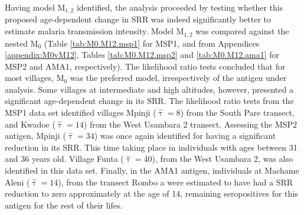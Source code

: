 Having model M$_{1,2}$ identified, the analysis proceeded by testing whether this proposed age-dependent change in SRR was indeed significantly better to estimate malaria transmission intensity.
Model M$_{1,2}$ was compared against the nested M$_0$ (Table \ref{tab:M0.M12.msp1} for MSP1, and from Appendices \ref{appendix:M0vM12}, Tables \ref{tab:M0.M12.msp2} and \ref{tab:M0.M12.ama1} for MSP2 and AMA1, respectively).
The likelihood ratio tests concluded that for most villages, M$_0$ was the preferred model, irrespectively of the antigen under analysis.
Some villages at intermediate and high altitudes, however, presented a significant age-dependent change in its SRR.
The likelihood ratio tests from the MSP1 data set identified villages Mpinji ($ \widehat{\uptau}=8$) from the South Pare transect, and Kwadoe ($ \widehat{\uptau}=14$) from the West Usambara 2 transect.
Assessing the MSP2 antigen, Mpinji ($ \widehat{\uptau}=34$) was once again identified for having a significant reduction in its SRR. This time taking place in individuals with ages between 31 and 36 years old.
Village Funta ($ \widehat{\uptau}=40$), from the West Usambara 2, was also identified in this data set.
Finally, in the AMA1 antigen, individuals at Machame Aleni ($ \widehat{\uptau}=14$), from the transect Rombo a were estimated to have had a SRR reduction to zero approximately at the age of 14, remaining seropositives for this antigen for the rest of their lifes.

